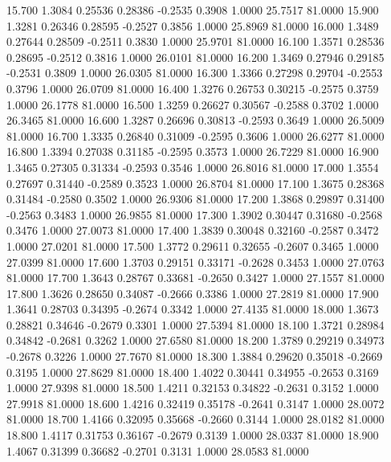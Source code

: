   15.700   1.3084   0.25536   0.28386  -0.2535   0.3908   1.0000  25.7517  81.0000
  15.900   1.3281   0.26346   0.28595  -0.2527   0.3856   1.0000  25.8969  81.0000
  16.000   1.3489   0.27644   0.28509  -0.2511   0.3830   1.0000  25.9701  81.0000
  16.100   1.3571   0.28536   0.28695  -0.2512   0.3816   1.0000  26.0101  81.0000
  16.200   1.3469   0.27946   0.29185  -0.2531   0.3809   1.0000  26.0305  81.0000
  16.300   1.3366   0.27298   0.29704  -0.2553   0.3796   1.0000  26.0709  81.0000
  16.400   1.3276   0.26753   0.30215  -0.2575   0.3759   1.0000  26.1778  81.0000
  16.500   1.3259   0.26627   0.30567  -0.2588   0.3702   1.0000  26.3465  81.0000
  16.600   1.3287   0.26696   0.30813  -0.2593   0.3649   1.0000  26.5009  81.0000
  16.700   1.3335   0.26840   0.31009  -0.2595   0.3606   1.0000  26.6277  81.0000
  16.800   1.3394   0.27038   0.31185  -0.2595   0.3573   1.0000  26.7229  81.0000
  16.900   1.3465   0.27305   0.31334  -0.2593   0.3546   1.0000  26.8016  81.0000
  17.000   1.3554   0.27697   0.31440  -0.2589   0.3523   1.0000  26.8704  81.0000
  17.100   1.3675   0.28368   0.31484  -0.2580   0.3502   1.0000  26.9306  81.0000
  17.200   1.3868   0.29897   0.31400  -0.2563   0.3483   1.0000  26.9855  81.0000
  17.300   1.3902   0.30447   0.31680  -0.2568   0.3476   1.0000  27.0073  81.0000
  17.400   1.3839   0.30048   0.32160  -0.2587   0.3472   1.0000  27.0201  81.0000
  17.500   1.3772   0.29611   0.32655  -0.2607   0.3465   1.0000  27.0399  81.0000
  17.600   1.3703   0.29151   0.33171  -0.2628   0.3453   1.0000  27.0763  81.0000
  17.700   1.3643   0.28767   0.33681  -0.2650   0.3427   1.0000  27.1557  81.0000
  17.800   1.3626   0.28650   0.34087  -0.2666   0.3386   1.0000  27.2819  81.0000
  17.900   1.3641   0.28703   0.34395  -0.2674   0.3342   1.0000  27.4135  81.0000
  18.000   1.3673   0.28821   0.34646  -0.2679   0.3301   1.0000  27.5394  81.0000
  18.100   1.3721   0.28984   0.34842  -0.2681   0.3262   1.0000  27.6580  81.0000
  18.200   1.3789   0.29219   0.34973  -0.2678   0.3226   1.0000  27.7670  81.0000
  18.300   1.3884   0.29620   0.35018  -0.2669   0.3195   1.0000  27.8629  81.0000
  18.400   1.4022   0.30441   0.34955  -0.2653   0.3169   1.0000  27.9398  81.0000
  18.500   1.4211   0.32153   0.34822  -0.2631   0.3152   1.0000  27.9918  81.0000
  18.600   1.4216   0.32419   0.35178  -0.2641   0.3147   1.0000  28.0072  81.0000
  18.700   1.4166   0.32095   0.35668  -0.2660   0.3144   1.0000  28.0182  81.0000
  18.800   1.4117   0.31753   0.36167  -0.2679   0.3139   1.0000  28.0337  81.0000
  18.900   1.4067   0.31399   0.36682  -0.2701   0.3131   1.0000  28.0583  81.0000
